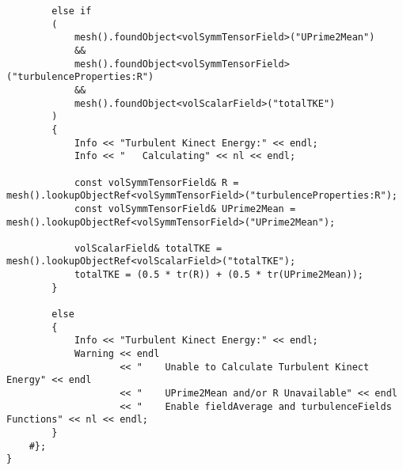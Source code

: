 \begin{lstlisting}
		else if
		(
			mesh().foundObject<volSymmTensorField>("UPrime2Mean")
			&&
			mesh().foundObject<volSymmTensorField>("turbulenceProperties:R")
			&&
			mesh().foundObject<volScalarField>("totalTKE")
		)
		{
			Info << "Turbulent Kinect Energy:" << endl;
			Info << "	Calculating" << nl << endl;

			const volSymmTensorField& R = mesh().lookupObjectRef<volSymmTensorField>("turbulenceProperties:R");
			const volSymmTensorField& UPrime2Mean = mesh().lookupObjectRef<volSymmTensorField>("UPrime2Mean");

			volScalarField& totalTKE = mesh().lookupObjectRef<volScalarField>("totalTKE");
			totalTKE = (0.5 * tr(R)) + (0.5 * tr(UPrime2Mean));
		}

		else
		{
			Info << "Turbulent Kinect Energy:" << endl;
			Warning << endl
					<< "	Unable to Calculate Turbulent Kinect Energy" << endl
					<< "	UPrime2Mean and/or R Unavailable" << endl
					<< "	Enable fieldAverage and turbulenceFields Functions" << nl << endl;
		}
	#};
}
\end{lstlisting}